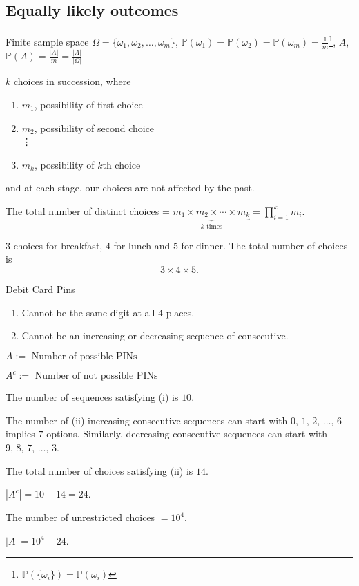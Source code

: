 \documentclass[10pt, a4paper]{article}
\begin{document}
\subsection{Equally likely outcomes}
Finite sample space $\Omega = \{\omega_1,\omega_2,\dotsc, \omega_m\}$, $\mathbb{P}(\omega_1) = \mathbb{P}(\omega_2) = \mathbb{P}(\omega_m) = \frac{1}{m}$\footnote{$\mathbb{P}(\{\omega_i\}) = \mathbb{P}(\omega_i)$}, $A$, $\mathbb{P}(A) = \frac{|A|}{m} = \frac{|A|}{|\Omega|}$

\begin{countprinc}
    $k$ choices in succession, where
    \begin{enumerate}[label = (\roman*)]
        \item $m_1$, possibility of first choice
        \item $m_2$, possibility of second choice \\ \vdots
        \item $m_k$, possibility of $k$th choice
    \end{enumerate}
    and at each stage, our choices are not affected by the past.

    The total number of distinct choices = $\underbrace{m_1 \times m_2 \times \dotsi \times m_k}_{k \text{ times}} = \prod_{i = 1}^{k}m_i$.
\end{countprinc}

\begin{example}
    $3$ choices for breakfast, $4$ for lunch and $5$ for dinner. The total number of choices is
    \[
    3 \times 4 \times 5.
    \]
\end{example}

\begin{example}
    Debit Card Pins
    \begin{enumerate}[label = (\roman*)]
        \item Cannot be the same digit at all $4$ places.
        \item Cannot be an increasing or decreasing sequence of consecutive.
    \end{enumerate}

    $A := \text{ Number of possible PINs}$
    
    $A^c := \text{ Number of not possible PINs}$

    The number of sequences satisfying (i) is $10$.

    The number of (ii) increasing consecutive sequences can start with $0,\, 1,\, 2,\,\dotsc,\, 6$ implies $7$ options. Similarly, decreasing consecutive sequences can start with $9,\,8,\,7,\,\dotsc,\,3$.

    The total number of choices satisfying (ii) is $14$.

    $|A ^ c| = 10 + 14 = 24$.

    The number of unrestricted choices $= 10 ^ 4$.

    $|A| = 10 ^ 4 - 24$.
\end{example}
\end{document}

